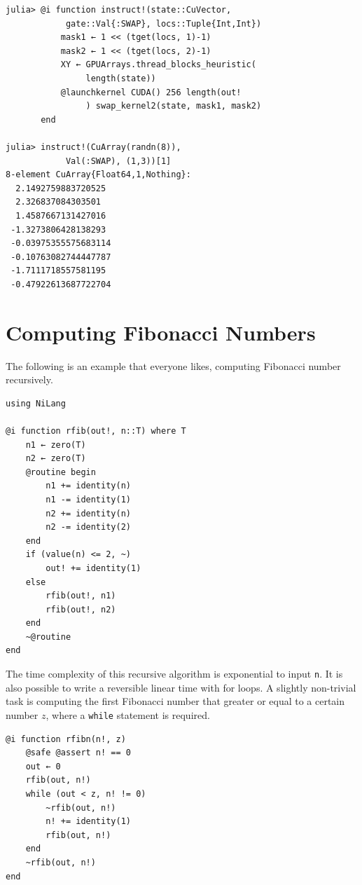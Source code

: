 \documentclass{article}
\newcommand{\<}{\langle}
\renewcommand{\>}{\rangle}
\theoremstyle{definition}\newtheorem{definition}{\textit{Definition}}
\begin{document}
\begin{minipage}{\columnwidth}
\begin{lstlisting}[multicols=2]
julia> @i function instruct!(state::CuVector,
            gate::Val{:SWAP}, locs::Tuple{Int,Int})
           mask1 ← 1 << (tget(locs, 1)-1)
           mask2 ← 1 << (tget(locs, 2)-1)
           XY ← GPUArrays.thread_blocks_heuristic(
                length(state))
           @launchkernel CUDA() 256 length(out!
                ) swap_kernel2(state, mask1, mask2)
       end

julia> instruct!(CuArray(randn(8)),
            Val(:SWAP), (1,3))[1]
8-element CuArray{Float64,1,Nothing}:
  2.1492759883720525 
  2.326837084303501  
  1.4587667131427016 
 -1.3273806428138293 
 -0.03975355575683114
 -0.10763082744447787
 -1.7111718557581195 
 -0.47922613687722704
\end{lstlisting}
\end{minipage}


\section{Computing Fibonacci Numbers}\label{app:fib}
The following is an example that everyone likes, computing Fibonacci number recursively.

\begin{minipage}{.88\columnwidth}
    \begin{lstlisting}
using NiLang

@i function rfib(out!, n::T) where T
    n1 ← zero(T)
    n2 ← zero(T)
    @routine begin
        n1 += identity(n)
        n1 -= identity(1)
        n2 += identity(n)
        n2 -= identity(2)
    end
    if (value(n) <= 2, ~)
        out! += identity(1)
    else
        rfib(out!, n1)
        rfib(out!, n2)
    end
    ~@routine
end
\end{lstlisting}
\end{minipage}

The time complexity of this recursive algorithm is exponential to input \texttt{n}. It is also possible to write a reversible linear time with for loops.
A slightly non-trivial task is computing the first Fibonacci number that greater or equal to a certain number $z$, where a \texttt{while} statement is required.

\begin{minipage}{.88\columnwidth}
\begin{lstlisting}
@i function rfibn(n!, z)
    @safe @assert n! == 0
    out ← 0
    rfib(out, n!)
    while (out < z, n! != 0)
        ~rfib(out, n!)
        n! += identity(1)
        rfib(out, n!)
    end
    ~rfib(out, n!)
end
\end{lstlisting}
\end{minipage}
\end{document}
